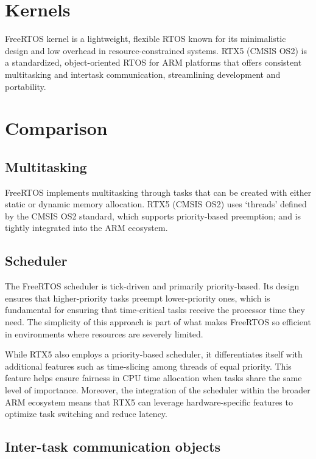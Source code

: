 \section*{Kernels}

FreeRTOS kernel is a lightweight, flexible RTOS known for its minimalistic design and low overhead in resource-constrained systems.
RTX5 (CMSIS OS2) is a standardized, object-oriented RTOS for ARM platforms that offers consistent multitasking and intertask communication, streamlining development and portability.

\section*{Comparison}

\subsection*{Multitasking}

FreeRTOS implements multitasking through tasks that can be created with either static or dynamic memory allocation.
RTX5 (CMSIS OS2) uses `threads' defined by the CMSIS OS2 standard, which supports priority-based preemption; and is tightly integrated into the ARM ecosystem.

\subsection*{Scheduler}

The FreeRTOS scheduler is tick-driven and primarily priority-based. Its design ensures that higher-priority tasks preempt lower-priority ones, which is fundamental for ensuring that time-critical tasks receive the processor time they need. 
The simplicity of this approach is part of what makes FreeRTOS so efficient in environments where resources are severely limited.

While RTX5 also employs a priority-based scheduler, it differentiates itself with additional features such as time-slicing among threads of equal priority.
This feature helps ensure fairness in CPU time allocation when tasks share the same level of importance. 
Moreover, the integration of the scheduler within the broader ARM ecosystem means that RTX5 can leverage hardware-specific features to optimize task switching and reduce latency.

\subsection*{Inter-task communication objects}

